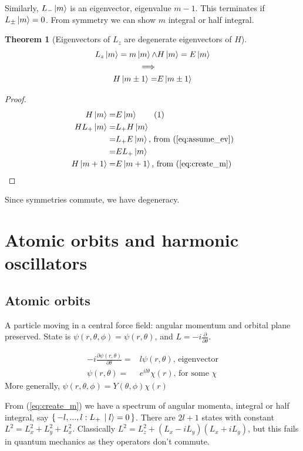 \documentclass[]{article}
\newcommand\numberthis{\addtocounter{equation}{1}\tag{\theequation}}
\newtheorem{thm}{Theorem}
\begin{document}
Similarly, $L_- \ket{m}$ is an eigenvector, eigenvalue $m-1$. This terminates if  $L_{\pm} \ket{m}=0$. From symmetry we can show $m$ integral or half integral.

\begin{thm}[Eigenvectors of $L_z$ are degenerate eigenvectors of $H$]
	\begin{align*}
	L_z \ket{m} = m \ket{m} \land& H \ket{m} = E \ket{m}\\
	 \implies&\\
	  H \ket{m \pm 1} =& E \ket{m \pm 1}
	\end{align*}
\end{thm} 
\begin{proof}
	\begin{align*}
	H \ket{m} =& E \ket{m} \numberthis \label{eq:assume_ev}\\
	H L_+ \ket{m} =& L_+ H \ket{m}\\
	=& L_+ E \ket{m} \text{, from (\ref{eq:assume_ev})}\\
	=& E L_+  \ket{m}\\
	H \ket{m+1} =& E \ket{m+1} \text{, from (\ref{eq:create_m})}
	\end{align*}
\end{proof}

Since symmetries commute, we have degeneracy.

\section{Atomic orbits and harmonic oscillators}

\subsection{Atomic orbits}

A particle moving in a central force field: angular momentum and orbital plane preserved. State is $\psi(r,\theta,\phi)= \psi(r,\theta)$, and $L = -i \frac{\partial}{\partial \theta}$.

\begin{align*}
-i \frac{\partial \psi(r,\theta)}{\partial \theta} =& l \psi(r,\theta) \text{, eigenvector}\\
\psi(r,\theta) =& e^{i l \theta} \chi(r) \text{, for some $\chi$}
\end{align*}
More generally, $\psi(r,\theta,\phi)= Y(\theta,\phi) \chi(r)$


From (\ref{eq:create_m}) we have a spectrum of angular momenta, integral or half integral, say $\set{-l,...,l:L_+\ket{l}=0}$. There are $2l+1$ states with constant $L^2 = L_x^2 + L_y^2 + L_x^2$. Classically $L^2 = L_z^2 +(L_x-iL_y)(L_x+iL_y)$, but this fails in quantum mechanics as they operators don't commute.
\end{document}
